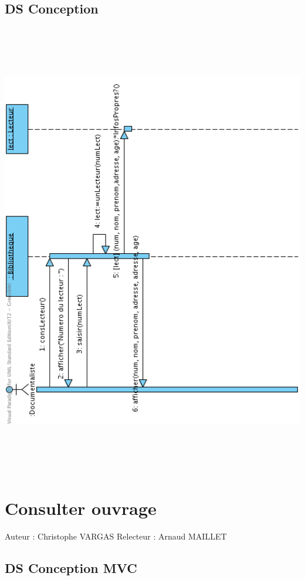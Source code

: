 \documentclass[a4paper,10pt]{report}
\begin{document}
\subsection*{DS Conception}
\bigskip
\includegraphics[height=200mm]{ConsLectNormal.png}
\newpage


\section*{Consulter ouvrage}

Auteur : Christophe VARGAS
Relecteur : Arnaud MAILLET

\subsection*{DS Conception MVC}
\end{document}
